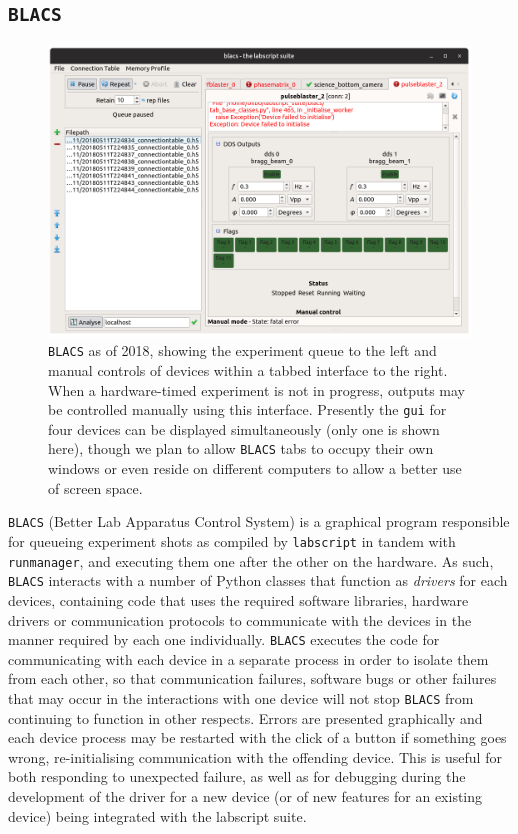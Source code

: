 \subsection{\texttt{BLACS}}

\begin{figure}
\begin{center}
\includegraphics[width=\textwidth]{figures/software/new_screenshots/blacs.png}
\caption{\texttt{BLACS} as of 2018, showing the experiment queue to the left and manual controls of devices within a tabbed interface to the right. When a hardware-timed experiment is not in progress, outputs may be controlled manually using this interface. Presently the \texttt{gui} for four devices can be displayed simultaneously (only one is shown here), though we plan to allow \texttt{BLACS} tabs to occupy their own windows or even reside on different computers to allow a better use of screen space.}\label{fig:blacs}
\end{center}
\end{figure}

\texttt{BLACS} (Better Lab Apparatus Control System) is a graphical program responsible for queueing experiment shots as compiled by \texttt{labscript} in tandem with \texttt{runmanager}, and executing them one after the other on the hardware. As such, \texttt{BLACS} interacts with a number of Python classes that function as \emph{drivers} for each devices, containing code that uses the required software libraries, hardware drivers or communication protocols to communicate with the devices in the manner required by each one individually. \texttt{BLACS} executes the code for communicating with each device in a separate process in order to isolate them from each other, so that communication failures, software bugs or other failures that may occur in the interactions with one device will not stop \texttt{BLACS} from continuing to function in other respects. Errors are presented graphically and each device process may be restarted with the click of a button if something goes wrong, re-initialising communication with the offending device. This is useful for both responding to unexpected failure, as well as for debugging during the development of the driver for a new device (or of new features for an existing device) being integrated with the labscript suite.

